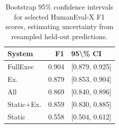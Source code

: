 \begin{table}[!htbp]
\centering
\scriptsize
\begin{tabular}{lrl}
\toprule
System & F1 & 95\textbackslash \% CI \\
\midrule
FullExec & 0.904 & [0.879, 0.925] \\
Ex. & 0.879 & [0.853, 0.904] \\
All & 0.869 & [0.840, 0.896] \\
Static+Ex. & 0.859 & [0.830, 0.885] \\
Static & 0.558 & [0.504, 0.612] \\
\bottomrule
\end{tabular}
\vspace{0.5em}
\caption{Bootstrap 95\% confidence intervals for selected HumanEval-X F1 scores, estimating uncertainty from resampled held-out predictions.}
\label{tab:bootstrap-f1}
\end{table}

